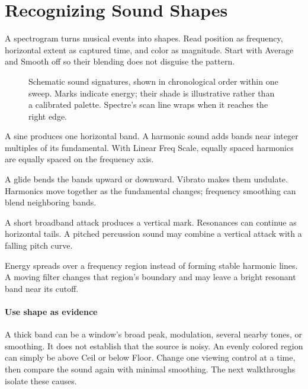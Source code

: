 \clearpage
\section{Recognizing Sound Shapes}\label{sec:shapes}

A spectrogram turns musical events into shapes. Read position as frequency,
horizontal extent as captured time, and color as magnitude. Start with
Average and Smooth off so their blending does not disguise the pattern.

\begin{figure}[!htp]
\centering

\caption{Schematic sound signatures, shown in chronological order within
one sweep. Marks indicate energy; their shade is illustrative rather than a
calibrated palette. Spectre's scan line wraps when it reaches the right edge.}
\end{figure}

\begin{description}[style=nextline,leftmargin=0pt,labelwidth=0pt,labelsep=0pt]
  \item[Steady tone] A sine produces one horizontal band. A harmonic sound
  adds bands near integer multiples of its fundamental. With Linear Freq
  Scale, equally spaced harmonics are equally spaced on the frequency axis.
  \item[Pitch movement] A glide bends the bands upward or downward.
  Vibrato makes them undulate. Harmonics move together as the fundamental
  changes; frequency smoothing can blend neighboring bands.
  \item[Attack and decay] A short broadband attack produces a vertical
  mark. Resonances can continue as horizontal tails. A pitched percussion
  sound may combine a vertical attack with a falling pitch curve.
  \item[Sustained noise] Energy spreads over a frequency region instead
  of forming stable harmonic lines. A moving filter changes that region's
  boundary and may leave a bright resonant band near its cutoff.
\end{description}

\paragraph{Use shape as evidence}
A thick band can be a window's broad peak, modulation, several nearby tones,
or smoothing. It does not establish that the source is noisy. An evenly
colored region can simply be above Ceil or below Floor. Change one viewing
control at a time, then compare the sound again with minimal smoothing.
The next walkthroughs isolate these causes.

